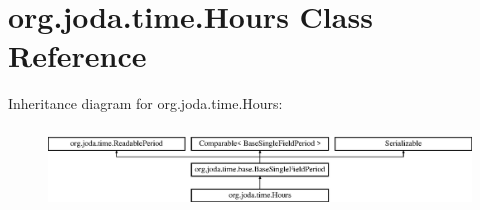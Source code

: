 \hypertarget{classorg_1_1joda_1_1time_1_1_hours}{\section{org.\-joda.\-time.\-Hours Class Reference}
\label{classorg_1_1joda_1_1time_1_1_hours}
}
Inheritance diagram for org.\-joda.\-time.\-Hours\-:\begin{figure}[H]
\begin{center}
\leavevmode
\includegraphics[height=2.187500cm]{classorg_1_1joda_1_1time_1_1_hours}
\end{center}
\end{figure}
